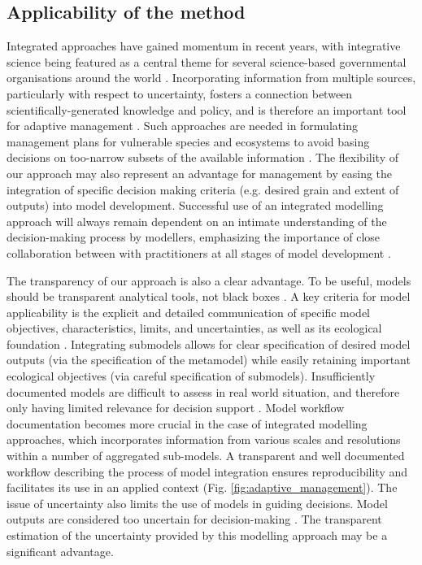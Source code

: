 \subsection*{Applicability of the method}
Integrated approaches have gained momentum in recent years, with integrative science being featured as a central theme for several science-based governmental organisations around the world \citep[e.g.][]{Bernier2013}. 
Incorporating information from multiple sources, particularly with respect to uncertainty,  fosters a connection between scientifically-generated knowledge and policy, and is therefore an important tool for adaptive management \citep[][Fig. \ref{fig:adaptive_management}]{Rehme2011}.
Such approaches are needed in formulating management plans for vulnerable species and ecosystems to avoid basing decisions on too-narrow subsets of the available information \citep{Dawson2011}.
The flexibility of our approach may also represent an advantage for management by easing the integration of specific decision making criteria (e.g. desired grain and extent of outputs) into model development. 
Successful use of an integrated modelling approach will always remain dependent on an intimate understanding of the decision-making process by modellers, emphasizing the importance of close collaboration between with practitioners at all stages of model development \citep{Guisan2013}.

The transparency of our approach is also a clear advantage. 
To be useful, models should be transparent analytical tools, not black boxes \citep{Addison2013}. 
A key criteria for model applicability is the explicit and detailed communication of specific model objectives, characteristics, limits, and uncertainties, as well as its ecological foundation \citep{Guisan2013}.
Integrating submodels allows for clear specification of desired model outputs (via the specification of the metamodel) while easily retaining important ecological objectives (via careful specification of submodels).
Insufficiently documented models are difficult to assess in real world situation, and therefore only having limited relevance  for decision support \citep{Guisan2013}.
Model workflow documentation becomes more crucial in the case of integrated modelling approaches, which incorporates information from various scales and resolutions within a number of aggregated sub-models. 
A transparent and well documented workflow describing the process of model integration ensures reproducibility and facilitates its use in an applied context (Fig. \ref{fig:adaptive_management}). 
The issue of uncertainty also limits the use of models in guiding decisions. 
Model outputs are considered too uncertain for decision-making \citep{Addison2013}. 
The transparent estimation of the uncertainty provided by this modelling approach may be a significant advantage. 

